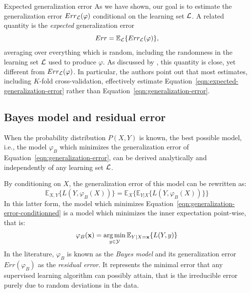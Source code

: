 \begin{remark}{Expected generalization error}
As we have shown, our goal is to estimate the generalization error $Err_{\cal
L}(\varphi)$ conditional on the learning set ${\cal L}$. A related quantity
is the \textit{expected} generalization error
\begin{equation}\label{eqn:expected-generalization-error}
Err = \mathbb{E}_{\cal L} \{ Err_{\cal L}(\varphi) \},
\end{equation}
averaging over everything which is random, including the randomness in the
learning set ${\cal L}$ used to produce $\varphi$. As discussed by
\citet{hastie:2005}, this quantity is close, yet different from $Err_{\cal
L}(\varphi)$. In particular, the authors point out that most estimates, including $K$-fold
cross-validation, effectively estimate
Equation~\ref{eqn:expected-generalization-error} rather than
Equation~\ref{eqn:generalization-error}.
\end{remark}

\subsection{Bayes model and residual error}
\label{sec:2:bayes-model}

When the probability distribution $P(X, Y)$ is known, the best possible model,
i.e., the model $\varphi_B$ which minimizes the generalization error of
Equation~\ref{eqn:generalization-error}, can be derived analytically and
independently of any learning set ${\cal L}$.

By conditioning on $X$, the generalization error of this model can be rewritten as:
\begin{equation}\label{eqn:generalization-error-conditionned}
\mathbb{E}_{X, Y}\{ L(Y, \varphi_B(X)) \} = \mathbb{E}_{X}\{ \mathbb{E}_{Y|X} \{ L(Y, \varphi_B(X)) \} \}
\end{equation}
In this latter form, the model which minimizes
Equation~\ref{eqn:generalization-error-conditionned} is a model which
minimizes the inner expectation point-wise, that is:
\begin{equation}
\varphi_B(\mathbf{x}) = \operatorname*{arg\,min}_{y \in {\cal Y}} \mathbb{E}_{Y|X=\mathbf{x}} \{ L(Y, y) \}
\end{equation}
In the literature, $\varphi_B$ is known as the \textit{Bayes model} and its
generalization error $Err(\varphi_B)$ as the \textit{residual error}. It represents the minimal
error that any supervised learning algorithm can possibly attain, that is
the irreducible error purely due to random deviations in the data.

